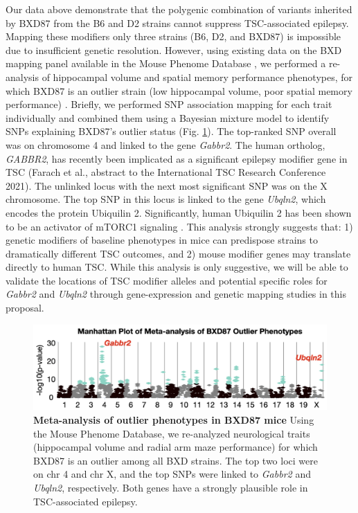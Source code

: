 \documentclass[
  12pt,
]{article}
\begin{document}
Our data above demonstrate that the polygenic combination of variants
inherited by BXD87 from the B6 and D2 strains cannot suppress
TSC-associated epilepsy. Mapping these modifiers only three strains (B6,
D2, and BXD87) is impossible due to insufficient genetic resolution.
However, using existing data on the BXD mapping panel available in the
Mouse Phenome Database \citep{31696236}, we performed a re-analysis of
hippocampal volume and spatial memory performance phenotypes, for which
BXD87 is an outlier strain (low hippocampal volume, poor spatial memory
performance) \citep{26449520}. Briefly, we performed SNP association
mapping for each trait individually and combined them using a Bayesian
mixture model \citep{22396665} to identify SNPs explaining BXD87's
outlier status (Fig. \ref{fig:meta}). The top-ranked SNP overall was on
chromosome 4 and linked to the gene \textit{Gabbr2}. The human ortholog,
\textit{GABBR2}, has recently been implicated as a significant epilepsy
modifier gene in TSC (Farach et al., abstract to the International TSC
Research Conference 2021). The unlinked locus with the next most
significant SNP was on the X chromosome. The top SNP in this locus is
linked to the gene \textit{Ubqln2}, which encodes the protein Ubiquilin
2. Significantly, human Ubiquilin 2 has been shown to be an activator of
mTORC1 signaling \citep{26740621, 30804504}. This analysis strongly
suggests that: 1) genetic modifiers of baseline phenotypes in mice can
predispose strains to dramatically different TSC outcomes, and 2) mouse
modifier genes may translate directly to human TSC. While this analysis
is only suggestive, we will be able to validate the locations of TSC
modifier alleles and potential specific roles for \textit{Gabbr2} and
\textit{Ubqln2} through gene-expression and genetic mapping studies in
this proposal.

\begin{figure}[ht!]
\includegraphics[width=\textwidth]{Fig3.png} 
\caption{\textbf{Meta-analysis of outlier phenotypes in BXD87 mice} Using the Mouse Phenome Database, we re-analyzed neurological traits (hippocampal volume and radial arm maze performance) for which BXD87 is an outlier among all BXD strains. The top two loci were on chr 4 and chr X, and the top SNPs were linked to \textit{Gabbr2} and \textit{Ubqln2}, respectively. Both genes have a strongly plausible role in TSC-associated epilepsy.}
\label{fig:meta}
\end{figure}
\end{document}
